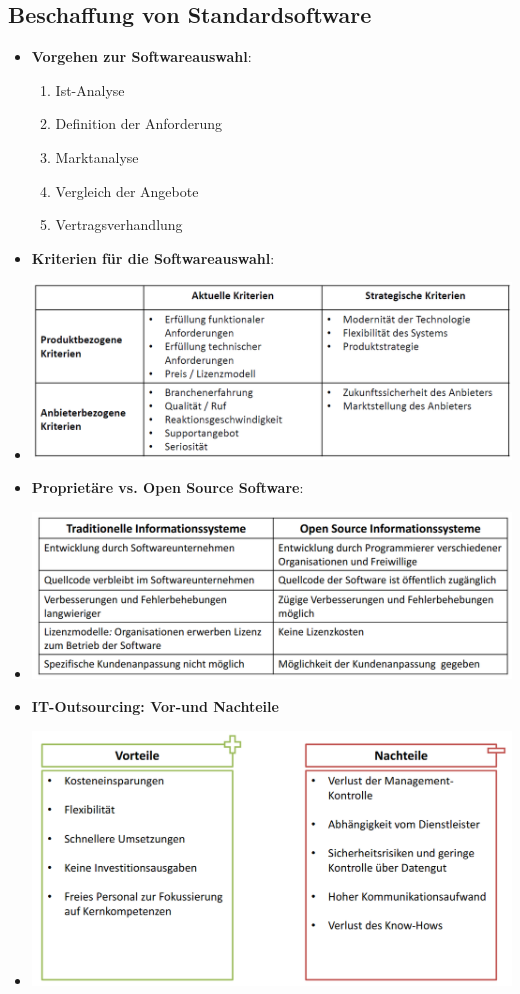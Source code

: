 \documentclass[12pt,a4paper]{article}
\begin{document}
\subsection{Beschaffung von Standardsoftware} %
\begin{itemize}
   \item \textbf{Vorgehen zur Softwareauswahl}:
      \begin{enumerate}
			\item Ist-Analyse
			\item Definition der Anforderung
			\item Marktanalyse
			\item Vergleich der Angebote
			\item Vertragsverhandlung
      \end{enumerate}
      
\newpage %
   \item \textbf{Kriterien für die Softwareauswahl}:
   \item[] \includegraphics[scale=0.45]{KriterienSoftwareauswahl.png}
   
   \item \textbf{Proprietäre vs. Open Source Software}:
   \item[] \includegraphics[scale=0.48]{foss.png}
   
   \item \textbf{IT-Outsourcing: Vor-und Nachteile}
   \item[] \includegraphics[scale=0.5]{out.png}
   

\end{itemize}
\end{document}
